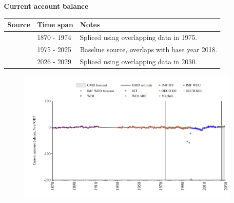 \documentclass[12pt,a4paper,landscape]{article}
\begin{document}
\begin{adjustbox}{max totalsize={\paperwidth}{\paperheight},center}
\begin{minipage}[t][\textheight][t]{\textwidth}
\vspace*{0.5cm}
{}
\begin{center}
{\Large\bfseries Current account balance}
\end{center}
\vspace{0.5cm}
\begin{table}[H]
\centering
\small
\begin{tabular}{|l|l|l|}
\hline
\textbf{Source} & \textbf{Time span} & \textbf{Notes} \\
\hline
\rowcolor{white}\cite{JST}& 1870 - 1974 &Spliced using overlapping data in 1975. \\
\rowcolor{lightgray}\cite{OECD_EO}& 1975 - 2025 &Baseline source, overlaps with base year 2018. \\
\rowcolor{white}\cite{IMF_WEO_forecast}& 2026 - 2029 &Spliced using overlapping data in 2030. \\
\hline
\end{tabular}
\end{table}
\begin{figure}[H]
\centering
\includegraphics[width=\textwidth,height=0.6\textheight,keepaspectratio]{graphs/ESP_CA_GDP.pdf}
\end{figure}
\end{minipage}
\end{adjustbox}
\end{document}
